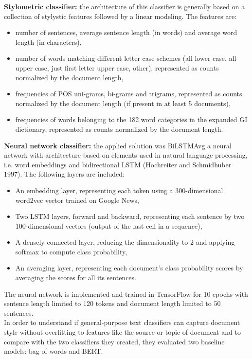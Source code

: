 \documentclass[conference]{IEEEtran}
\begin{document}
\begin{appendices}
\textbf{Stylometric classifier:} the architecture of this classifier is generally based on a collection of stylystic features followed by a linear modeling. The features are: 
	\begin{itemize}
	\item number of sentences, average sentence length (in words) and average word length (in characters),
	\item number of words matching different letter case schemes (all lower case, all upper case, just first letter upper case, other), represented as counts normalized by the document length,
	\item frequencies of POS uni-grams, bi-grams and trigrams, represented as counts normalized by the document length (if present in at least 5 documents),
	\item frequencies of words belonging to the 182 word categories in the expanded GI dictionary, represented as counts normalized by the document length.
	\end{itemize}

\textbf{Neural network classifier:} the applied solution was BiLSTMAvg a neural network with architecture based on elements used in natural language processing, i.e. word embeddings \cite{mikolov2013efficient} and bidirectional LSTM (Hochreiter and Schmidhuber 1997). The following layers are included:
	\begin{itemize}
	\item An embedding layer, representing each token using a 300-dimensional word2vec vector trained on Google News,
	\item Two LSTM layers, forward and backward, representing each sentence by two 100-dimensional vectors (output of the last cell in a sequence),
	\item A densely-connected layer, reducing the dimensionality to 2 and applying softmax to compute class probability,
	\item An averaging layer, representing each document’s class probability scores by averaging the scores for all its sentences.
	\end{itemize}
The neural network is implemented and trained in TensorFlow for 10 epochs with sentence length limited to 120 tokens and document length limited to 50 sentences.\\

In order to understand if general-purpose text classifiers can capture document style without overfitting to features like the source or topic of document and to compare with the two classifiers they created, they evaluated two baseline models: bag of words and BERT.\\


\end{appendices}
\end{document}
